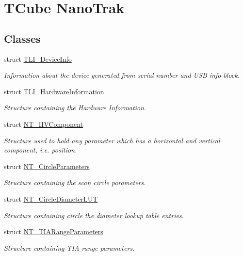 \hypertarget{group___t_cube_nano_trak}{}\section{T\+Cube Nano\+Trak}
\label{group___t_cube_nano_trak}
\subsection*{Classes}
\begin{DoxyCompactItemize}
\item 
struct \hyperlink{struct_t_l_i___device_info}{T\+L\+I\+\_\+\+Device\+Info}
\begin{DoxyCompactList}\small\item\em Information about the device generated from serial number and U\+SB info block. \end{DoxyCompactList}\item 
struct \hyperlink{struct_t_l_i___hardware_information}{T\+L\+I\+\_\+\+Hardware\+Information}
\begin{DoxyCompactList}\small\item\em Structure containing the Hardware Information. \end{DoxyCompactList}\item 
struct \hyperlink{struct_n_t___h_v_component}{N\+T\+\_\+\+H\+V\+Component}
\begin{DoxyCompactList}\small\item\em Structure used to hold any parameter which has a horizontal and vertical component, i.\+e. position. \end{DoxyCompactList}\item 
struct \hyperlink{struct_n_t___circle_parameters}{N\+T\+\_\+\+Circle\+Parameters}
\begin{DoxyCompactList}\small\item\em Structure containing the scan circle parameters. \end{DoxyCompactList}\item 
struct \hyperlink{struct_n_t___circle_diameter_l_u_t}{N\+T\+\_\+\+Circle\+Diameter\+L\+UT}
\begin{DoxyCompactList}\small\item\em Structure containing circle the diameter lookup table entries. \end{DoxyCompactList}\item 
struct \hyperlink{struct_n_t___t_i_a_range_parameters}{N\+T\+\_\+\+T\+I\+A\+Range\+Parameters}
\begin{DoxyCompactList}\small\item\em Structure containing T\+IA range parameters. \end{DoxyCompactList}\item 

\end{DoxyCompactItemize}
